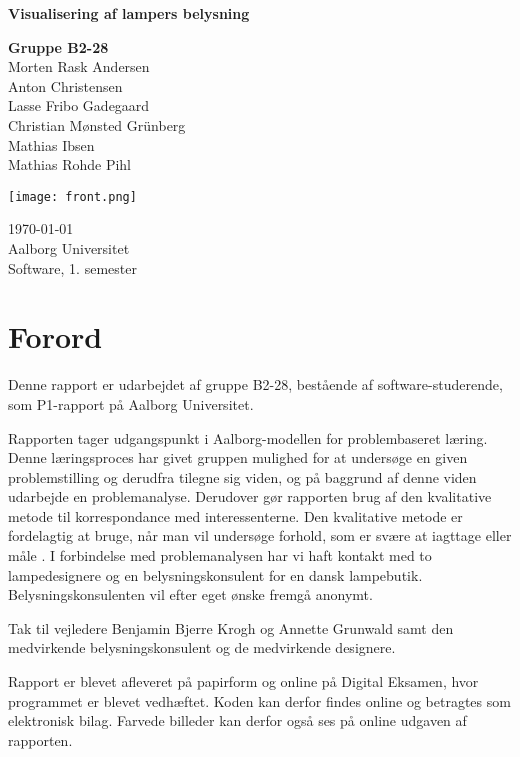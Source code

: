 \begin{titlepage}
  \vspace{0.2cm}
  \begin{center}
    \Huge{\textbf{Visualisering af lampers belysning}}
  \end{center}
  \vspace{0.2cm}
  \begin{center}
    \Large{\textbf{Gruppe B2-28}}\\
	Morten Rask Andersen\\
	Anton Christensen\\
	Lasse Fribo Gadegaard\\
	Christian Mønsted Grünberg\\
	Mathias Ibsen\\
	Mathias Rohde Pihl
  \end{center}
  \vfill
  \begin{center}
  \texttt{[image: front.png]}
  \end{center}
  \begin{center}
 	\today\\
    Aalborg Universitet\\
    Software, 1. semester
  \end{center}
\end{titlepage}



\addtocounter{page}{-1}
\clearpage



\clearpage


\section{Forord}
Denne rapport er udarbejdet af gruppe B2-28, bestående af software-studerende, som P1-rapport på Aalborg Universitet.

Rapporten tager udgangspunkt i Aalborg-modellen for problembaseret læring. Denne læringsproces har givet gruppen mulighed for at undersøge en given problemstilling og derudfra tilegne sig viden, og på baggrund af denne viden udarbejde en problemanalyse. Derudover gør rapporten brug af den kvalitative metode til korrespondance med interessenterne. Den kvalitative metode er fordelagtig at bruge, når man vil undersøge forhold, som er svære at iagttage eller måle \cite{kvalitativ_metode}. I forbindelse med problemanalysen har vi haft kontakt med to lampedesignere og en belysningskonsulent for en dansk lampebutik. Belysningskonsulenten vil efter eget ønske fremgå anonymt. 

Tak til vejledere Benjamin Bjerre Krogh og Annette Grunwald samt den medvirkende belysningskonsulent og de medvirkende designere.

Rapport er blevet afleveret på papirform og online på Digital Eksamen, hvor programmet er blevet vedhæftet. Koden kan derfor findes online og betragtes som elektronisk bilag. Farvede billeder kan derfor også ses på online udgaven af rapporten.
\clearpage

\clearpage